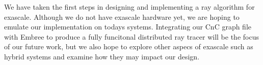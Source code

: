 \label{sec:conclusion}

We have taken the first steps in designing and implementing a ray algorithm 
for exascale.  Although we do not have exascale hardware yet, we are hoping 
to emulate our implementation on todays systems.  Integrating our CnC graph 
file with Embree to produce a fully funcitonal distributed ray tracer will 
be the focus of our future work, but we also hope to explore other aspecs of 
exascale such as hybrid systems and examine how they may impact our design.  
